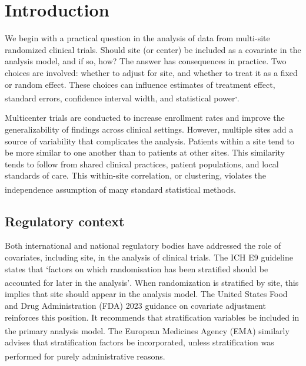 \documentclass[
  11pt,
]{article}
\begin{document}
{
\setcounter{tocdepth}{2}
\tableofcontents
}
\section{Introduction}\label{introduction}

We begin with a practical question in the analysis of data from
multi-site randomized clinical trials. Should site (or center) be
included as a covariate in the analysis model, and if so, how?
The answer has consequences in practice. Two choices are
involved: whether to adjust for site, and whether to treat it as
a fixed or random effect. These choices can influence estimates
of treatment effect, standard errors, confidence interval width,
and statistical power\textsuperscript{,}.

Multicenter trials are conducted to increase enrollment rates
and improve the generalizability of findings across clinical
settings. However, multiple sites add a source of variability
that complicates the analysis. Patients within a site tend to be
more similar to one another than to patients at other sites. This
similarity tends to follow from shared clinical practices, patient
populations, and local standards of care. This within-site
correlation, or clustering, violates the independence assumption
of many standard statistical methods\textsuperscript{}.

\subsection{Regulatory context}\label{regulatory-context}

Both international and national regulatory bodies have addressed
the role of covariates, including site, in the analysis of
clinical trials. The ICH E9 guideline states that `factors on
which randomisation has been stratified should be accounted for
later in the analysis'\textsuperscript{}. When randomization is
stratified by site, this implies that site should appear in the
analysis model. The United States Food and Drug Administration
(FDA) 2023 guidance on covariate adjustment reinforces this
position. It recommends that stratification variables be included
in the primary analysis model\textsuperscript{}. The European
Medicines Agency (EMA) similarly advises that stratification
factors be incorporated, unless stratification was performed for
purely administrative reasons\textsuperscript{}.
\end{document}
